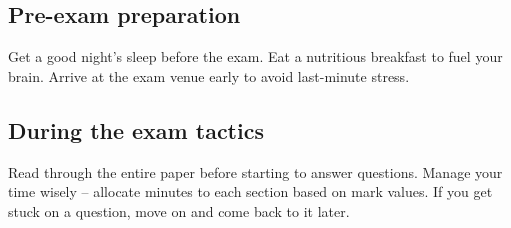 \documentclass[a4paper]{article}
\begin{document}
\subsection{Pre-exam preparation}
Get a good night's sleep before the exam.
Eat a nutritious breakfast to fuel your brain.
Arrive at the exam venue early to avoid last-minute stress.

\subsection{During the exam tactics}
Read through the entire paper before starting to answer questions.
Manage your time wisely – allocate minutes to each section based on mark values.
If you get stuck on a question, move on and come back to it later.



\cleardoublepage

\clearpage
\thispagestyle{empty}
\hfill
\clearpage

\cleardoublepage

\clearpage
\thispagestyle{empty}
\hfill
\clearpage
\end{document}
